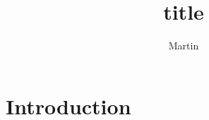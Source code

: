 \documentclass[a4paper]{article}
\author{Martin}
\title{title}
\begin{document}
\maketitle


\section{Introduction}

\end{document}
